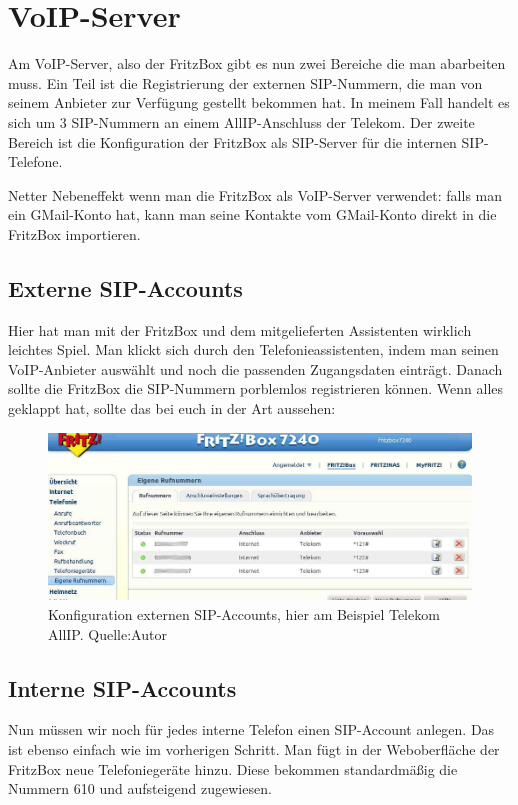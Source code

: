 \documentclass[a4paper,12pt]{scrbook}
\begin{document}
\section{VoIP-Server}
Am VoIP-Server, also der FritzBox gibt es nun zwei Bereiche die man abarbeiten muss. Ein Teil ist die Registrierung der externen SIP-Nummern,
die man von seinem Anbieter zur Verfügung gestellt bekommen hat. In meinem Fall handelt es sich um 3 SIP-Nummern an einem AllIP-Anschluss der Telekom.
Der zweite Bereich ist die Konfiguration der FritzBox als SIP-Server für die internen SIP-Telefone.


Netter Nebeneffekt wenn man die FritzBox als VoIP-Server verwendet: falls man ein GMail-Konto hat, kann man seine Kontakte vom GMail-Konto direkt in die FritzBox importieren.
\subsection{Externe SIP-Accounts}
Hier hat man mit der FritzBox und dem mitgelieferten Assistenten wirklich leichtes Spiel. Man klickt sich durch den Telefonieassistenten, indem man seinen 
VoIP-Anbieter auswählt und noch die passenden Zugangsdaten einträgt. Danach sollte die FritzBox die SIP-Nummern porblemlos registrieren können. Wenn alles geklappt hat,
sollte das bei euch in der Art aussehen:

\begin{figure}[H]
\begin{center}
\includegraphics[width=1\hsize]{./images/voip-server-fritzbox-extsip.png}
\end{center}
\caption[Konfiguration externen SIP-Accounts, hier am Beispiel Telekom AllIP.]
{\label{voip-server-fritzbox-extsip}Konfiguration externen SIP-Accounts, hier am Beispiel Telekom AllIP. Quelle:Autor}
\end{figure}

\subsection{Interne SIP-Accounts}
Nun müssen wir noch für jedes interne Telefon einen SIP-Account anlegen. Das ist ebenso einfach wie im vorherigen Schritt. Man fügt in der Weboberfläche 
der FritzBox neue Telefoniegeräte hinzu. Diese bekommen standardmäßig die Nummern 610 und aufsteigend zugewiesen. 
\end{document}
